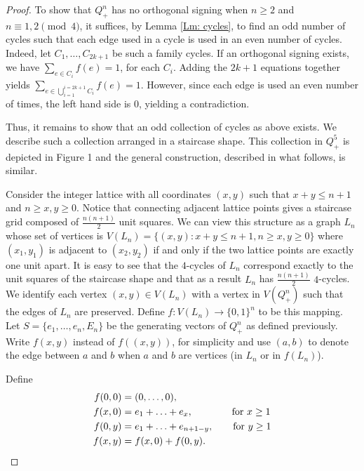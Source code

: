 \begin{proof}
To show that $Q_+^n$ has no orthogonal signing when $n \geq 2$ and $n \equiv 1, 2 \pmod{4}$, it suffices, by Lemma \ref{Lm: cycles}, to find an odd number of cycles such that each edge used in a cycle is used in an even number of cycles.
Indeed, let $C_1, \ldots, C_{2k+1}$ be such a family
cycles. If an orthogonal signing exists, we 
have $\sum_{e \in C_{i}} f(e) = 1$, for each $C_i$. Adding 
the $2k+1$ equations together yields 
$\sum_{e \in \bigcup_{i=1}^{i=2k+1}C_i} f(e) = 1$. 
However, since each edge is used an even number of times, the left 
hand side is $0$, yielding a contradiction. 

Thus, it remains to show that an odd collection of cycles as above 
exists. We describe such a collection arranged in a 
staircase shape. This collection in $Q_+^5$ is depicted in Figure 1 
and the general construction, described in what follows, is similar. 

Consider the integer lattice with all coordinates $(x, y)$ such 
that $x+y \leq n+1$ and $n\geq x, y \geq 0$. Notice that 
connecting adjacent lattice points gives a staircase grid 
composed of $\frac{n(n+1)}{2}$ unit squares. We can view this 
structure as a graph $L_n$ whose set of vertices is
$V(L_n)= \{(x,y): x+y \leq n+1, n\geq x,y\geq0 \}$ where 
$(x_1, y_1)$ is adjacent to $(x_2, y_2)$ if and only if the two lattice points are exactly one unit apart. It is easy to see that the $4$-cycles of $L_n$ 
correspond exactly to the unit squares of the staircase shape 
and that as a result $L_n$ has $\frac{n(n+1)}{2}$ $4$-cycles.
We identify each vertex $(x,y) \in V(L_n)$ with a vertex 
in $V(Q_+^n)$ such that the edges  of $L_n$ are preserved. 
Define $f: V(L_n) \xrightarrow{} \{0, 1\}^n$ to be this mapping. 
Let $S = \{e_1, \ldots, e_n, E_n \}$ be the generating vectors 
of $Q_+^n$ as defined previously. 
Write $f(x,y)$ instead of $f((x,y))$, for simplicity and use $(a,b)$ to denote the edge between $a$ and $b$ 
when $a$ and $b$ are vertices (in $L_n$ or in $f(L_n)$).

Define 
\begin{align*}
    f(0,0) &= (0, \ldots, 0), \\
    f(x, 0) &= e_1 + \ldots + e_x, \quad \quad \quad \text{\quad for $x \geq 1$} \\ 
    f(0, y) &= e_1 + \ldots + e_{n+1-y}, \quad \quad \text{for $y \geq 1$} \\
    f(x, y) &= f(x, 0) + f(0, y).
\end{align*}


\end{proof}
